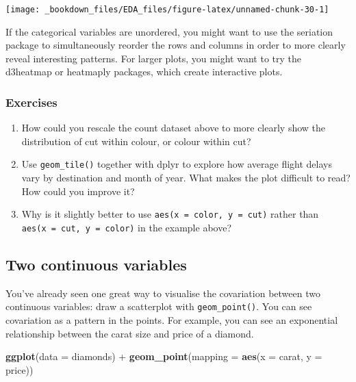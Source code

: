 \documentclass[]{book}
\newenvironment{Shaded}{\begin{snugshade}}{\end{snugshade}}
\newcommand{\KeywordTok}[1]{\textcolor[rgb]{0.13,0.29,0.53}{\textbf{{#1}}}}
\newcommand{\DataTypeTok}[1]{\textcolor[rgb]{0.13,0.29,0.53}{{#1}}}
\newcommand{\StringTok}[1]{\textcolor[rgb]{0.31,0.60,0.02}{{#1}}}
\newcommand{\NormalTok}[1]{{#1}}
\begin{document}
\begin{center}\texttt{[image: \_bookdown\_files/EDA\_files/figure-latex/unnamed-chunk-30-1]} \end{center}

If the categorical variables are unordered, you might want to use the
seriation package to simultaneously reorder the rows and columns in
order to more clearly reveal interesting patterns. For larger plots, you
might want to try the d3heatmap or heatmaply packages, which create
interactive plots.

\subsubsection{Exercises}\label{exercises-16}

\begin{enumerate}
\def\labelenumi{\arabic{enumi}.}
\item
  How could you rescale the count dataset above to more clearly show the
  distribution of cut within colour, or colour within cut?
\item
  Use \texttt{geom\_tile()} together with dplyr to explore how average
  flight delays vary by destination and month of year. What makes the
  plot difficult to read? How could you improve it?
\item
  Why is it slightly better to use \texttt{aes(x\ =\ color,\ y\ =\ cut)}
  rather than \texttt{aes(x\ =\ cut,\ y\ =\ color)} in the example
  above?
\end{enumerate}

\subsection{Two continuous variables}\label{two-continuous-variables}

You've already seen one great way to visualise the covariation between
two continuous variables: draw a scatterplot with
\texttt{geom\_point()}. You can see covariation as a pattern in the
points. For example, you can see an exponential relationship between the
carat size and price of a diamond.

\begin{Shaded}
\begin{Highlighting}[]
\KeywordTok{ggplot}\NormalTok{(}\DataTypeTok{data =} \NormalTok{diamonds) +}
\StringTok{  }\KeywordTok{geom_point}\NormalTok{(}\DataTypeTok{mapping =} \KeywordTok{aes}\NormalTok{(}\DataTypeTok{x =} \NormalTok{carat, }\DataTypeTok{y =} \NormalTok{price))}
\end{Highlighting}
\end{Shaded}
\end{document}

